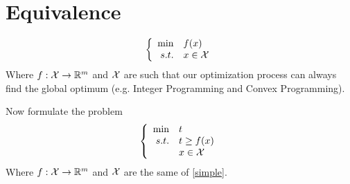 \documentclass{article}
\def\setR{\mathbb{R}}
\def\X{{\cal X}}
\begin{document}
	    \section{Equivalence}
	    \begin{equation}\label{simple}
	    \left\{
	    \begin{array}{rl}
	    \min & f(x) \\
	    s.t.& x \in \X
	    \end{array}
	    \right.
	    \end{equation}
	    Where $f:\X \rightarrow \setR^m$  and $\X$ are such that our optimization process can always find the global optimum (e.g. Integer Programming and Convex Programming).
	    
	    Now formulate the problem
	     \begin{equation}\label{modified}
	     \left\{
	     \begin{array}{rl}
	     \min & t \\
	     s.t. & t \ge f(x)\\
	     & x \in \X
	     \end{array}
	     \right.
	     \end{equation}
	     Where $f:\X \rightarrow \setR^m$  and $\X$ are the same of \eqref{simple}.
	    
\end{document}
